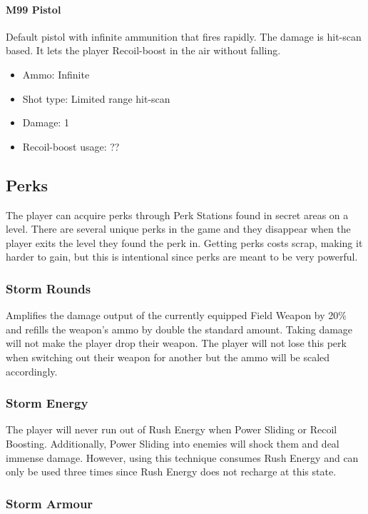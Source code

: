\documentclass[12pt]{article}
\begin{document}
\paragraph{M99 Pistol} 

Default pistol with infinite ammunition that fires rapidly. The damage is hit-scan based. It lets the player Recoil-boost in the air without falling.

\begin{itemize}
	\item Ammo: Infinite
	\item Shot type: Limited range hit-scan
	\item Damage: 1
	\item Recoil-boost usage: ??
\end{itemize}

\subsection{Perks}

The player can acquire perks through Perk Stations found in secret areas on a level. There are several unique perks in the game and they disappear when the player exits the level they found the perk in. Getting perks costs scrap, making it harder to gain, but this is intentional since perks are meant to be very powerful. 

\subsubsection{Storm Rounds}

Amplifies the damage output of the currently equipped Field Weapon by 20\% and refills the weapon's ammo by double the standard amount. Taking damage will not make the player drop their weapon. The player will not lose this perk when switching out their weapon for another but the ammo will be scaled accordingly.

\subsubsection{Storm Energy}

The player will never run out of Rush Energy when Power Sliding or Recoil Boosting. Additionally, Power Sliding into enemies will shock them and deal immense damage. However, using this technique consumes Rush Energy and can only be used three times since Rush Energy does not recharge at this state. 

\subsubsection{Storm Armour}
\end{document}
